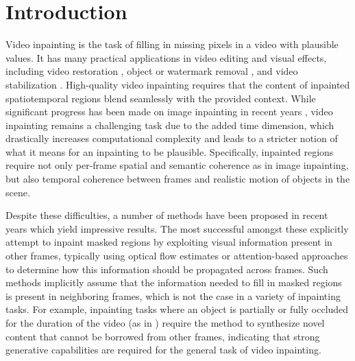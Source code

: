 \chapter{Introduction}
\label{sec:intro}

Video inpainting is the task of filling in missing pixels in a video with plausible values. It has many practical applications in video editing and visual effects, including video restoration \citep{restoration}, object or watermark removal \citep{occluding}, and video stabilization \citep{stabilization}. High-quality video inpainting requires that the content of inpainted spatiotemporal regions blend seamlessly with the provided context. While significant progress has been made on image inpainting in recent years \citep{palette, repaint, imin1, imin3, imin4, imin5}, video inpainting remains a challenging task due to the added time dimension, which drastically increases computational complexity and leads to a stricter notion of what it means for an inpainting to be plausible. Specifically, inpainted regions require not only per-frame spatial and semantic coherence as in image inpainting, but also temporal coherence between frames and realistic motion of objects in the scene.  


Despite these difficulties, a number of methods have been proposed in recent years which yield impressive results. The most successful amongst these explicitly attempt to inpaint masked regions by exploiting visual information present in other frames, typically using optical flow estimates \citep{temporally, endtoend, deepvideoinpainting, dfvi, flowedgeguided} or attention-based approaches \citep{learningjoint, fuseformer, onionpeel, copypaste} to determine how this information should be propagated across frames. Such methods implicitly assume that the information needed to fill in masked regions is present in neighboring frames, which is not the case in a variety of inpainting tasks. For example, inpainting tasks where an object is partially or fully occluded for the duration of the video (as in ) require the method to synthesize novel content that cannot be borrowed from other frames, indicating that strong generative capabilities are required for the general task of video inpainting. 

